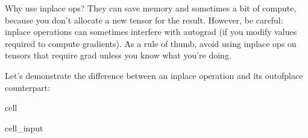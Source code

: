 \documentclass[letterpaper,10pt,english]{jupyterBook}
\begin{document}
\sphinxAtStartPar
Why use in\sphinxhyphen{}place ops? They can save memory and sometimes a bit of compute, because you don’t allocate a new tensor for the result. However, be careful: in\sphinxhyphen{}place operations can sometimes interfere with autograd (if you modify values required to compute gradients). As a rule of thumb, avoid using in\sphinxhyphen{}place ops on tensors that require grad unless you know what you’re doing.

\sphinxAtStartPar
Let’s demonstrate the difference between an in\sphinxhyphen{}place operation and its out\sphinxhyphen{}of\sphinxhyphen{}place counterpart:

\begin{sphinxuseclass}{cell}\begin{sphinxVerbatimInput}

\begin{sphinxuseclass}{cell_input}
\begin{sphinxVerbatim}[commandchars=\\\{\}]
  
 

  
   
   

   
\end{sphinxVerbatim}

\end{sphinxuseclass}\end{sphinxVerbatimInput}
\begin{sphinxVerbatimOutput}


\end{sphinxVerbatimOutput}
\end{sphinxuseclass}
\end{document}
